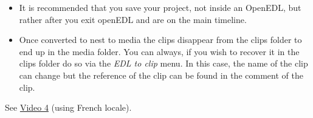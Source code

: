 \begin{itemize}
	\item It is recommended that you save your project, not inside an OpenEDL, but rather after you exit openEDL and are on the main timeline.
	\item Once converted to nest to media the clips disappear from the clips folder to end up in the media folder. You can always, if you wish to recover it in the clips folder do so via the \textit{EDL to clip} menu. In this case, the name of the clip can change but the reference of the clip can be found in the comment of the clip.
\end{itemize}

See \href{https://youtu.be/bfYaBqVbdCo}{Video 4} (using French locale).

